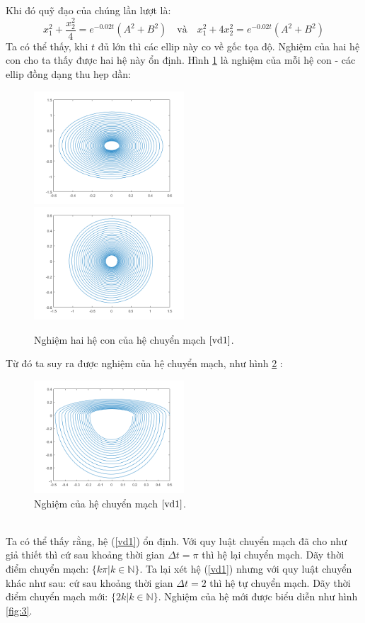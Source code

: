 \documentclass[14pt,a4paper,oneside]{report}		%
\theoremstyle{definition}
\begin{document}
Khi đó quỹ đạo của chúng lần lượt là:
$$
x^2_1 + \frac{x_2^2}{4} = e^{-0.02t}(A^2+B^2) \quad\text{và}\quad x^2_1 + 4x_2^2 = e^{-0.02t}(A^2+B^2)
$$
Ta có thể thấy, khi $t$ đủ lớn thì các ellip này co về gốc tọa độ. Nghiệm của hai hệ con cho ta thấy được hai hệ này ổn định. Hình \ref{fig:1} là nghiệm của mỗi hệ con - các ellip đồng dạng thu hẹp dần:
\begin{figure}[h]
\includegraphics[width=0.5\textwidth]{graph1.png}
\hspace{\fill}
\includegraphics[width=0.5\textwidth]{graph2.png}
\caption{Nghiệm hai hệ con của hệ chuyển mạch $\ref{vd1}$.}\label{fig:1}
\end{figure}
\newpage
Từ đó ta suy ra được nghiệm của hệ chuyển mạch, như hình \ref{fig:2} :
\begin{figure}[h]
\centering
\includegraphics[width=0.5\textwidth]{graph3.png}
\caption{Nghiệm của hệ chuyển mạch $\ref{vd1}$.}\label{fig:2}
\end{figure}\\
Ta có thể thấy rằng, hệ (\ref{vd1}) ổn định. Với quy luật chuyển mạch đã cho như giả thiết thì cứ sau khoảng thời gian $\Delta t=\pi$ thì hệ lại chuyển mạch. Dãy thời điểm chuyển mạch: $\{k\pi | k\in\mathbb{N}\}$. Ta lại xét hệ (\ref{vd1}) nhưng với quy luật chuyển khác như sau: cứ sau khoảng thời gian $\Delta t=2$ thì hệ tự chuyển mạch. Dãy thời điểm chuyển mạch mới: $\{2k|k\in\mathbb{N}\}$. Nghiệm của hệ mới được biểu diễn như hình \ref{fig:3}.
\end{document}
